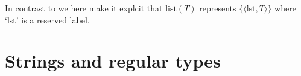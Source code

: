 In contrast to \cite{Cooper2012} we here make it explcit that $\mathrm{list}(T)$
represents $\{\langle\mathrm{lst},T\rangle\}$ %
where `lst' %
is a reserved label. 


\section{Strings and regular types}
\label{sec:regular}
\label{app:strings}

 
 

 





